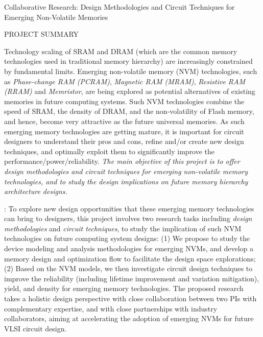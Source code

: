\documentclass[11pt,letterpaper]{article}
\begin{document}
\begin{center}
{\Large Collaborative Research: Design Methodologies and Circuit Techniques for Emerging Non-Volatile Memories}\\
\end{center}
\begin{center}
{\large  PROJECT SUMMARY} \\
\end{center}

\normalsize
Technology scaling of SRAM and DRAM (which are the common memory technologies used in traditional memory hierarchy) are increasingly constrained by fundamental limits. Emerging non-volatile memory (NVM) technologies, such as \textit{Phase-change RAM (PCRAM)}, \textit{Magnetic RAM (MRAM)},  \textit{Resistive RAM (RRAM)} and \textit{Memristor}, are being explored as potential alternatives of existing memories in future computing systems. Such NVM technologies combine the speed of SRAM, the density of DRAM, and the non-volatility of Flash memory, and hence, become very attractive as the future universal memories.
As such emerging memory technologies are getting mature, it is important for circuit designers to understand their pros and cons, refine and/or create new design techniques, and optimally exploit them to significantly improve the performance/power/reliability. \textit{The main objective of this project is to offer design methodologies and circuit techniques for emerging non-volatile memory technologies, and to study the design implications on future memory hierarchy architecture designs.}

{}:
To explore new design opportunities that these emerging memory technologies can bring to designers,  this project involves two research tasks including \emph{design methodologies} and \emph{circuit techniques}, to study the implication of such NVM technologies on future computing system designs: (1) We propose to study the device modeling and analysis methodologies for emerging NVMs, and develop a memory design and optimization flow to facilitate the design space explorations; (2) Based on the NVM models, we then investigate circuit design techniques to improve the reliability (including lifetime improvement and variation mitigation), yield, and density for emerging memory technologies. The proposed research takes a holistic design perspective with close collaboration between two PIs with complementary expertise, and with close partnerships with industry collaborators, aiming at accelerating the adoption of emerging NVMs for future VLSI circuit design.
\end{document}
